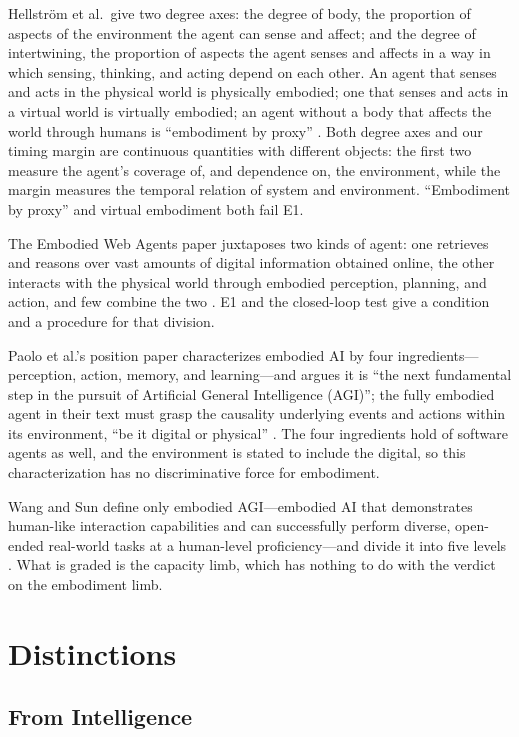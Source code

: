 \documentclass[10pt]{article}
\begin{document}
Hellstr\"om et al.\ give two degree axes: the degree of body, the proportion of aspects of the environment the agent can sense and affect; and the degree of intertwining, the proportion of aspects the agent senses and affects in a way in which sensing, thinking, and acting depend on each other. An agent that senses and acts in the physical world is physically embodied; one that senses and acts in a virtual world is virtually embodied; an agent without a body that affects the world through humans is ``embodiment by proxy'' \cite{hellstrom2024}. Both degree axes and our timing margin are continuous quantities with different objects: the first two measure the agent's coverage of, and dependence on, the environment, while the margin measures the temporal relation of system and environment. ``Embodiment by proxy'' and virtual embodiment both fail E1.

The Embodied Web Agents paper juxtaposes two kinds of agent: one retrieves and reasons over vast amounts of digital information obtained online, the other interacts with the physical world through embodied perception, planning, and action, and few combine the two \cite{ewa2025}. E1 and the closed-loop test give a condition and a procedure for that division.

Paolo et al.'s position paper characterizes embodied AI by four ingredients---perception, action, memory, and learning---and argues it is ``the next fundamental step in the pursuit of Artificial General Intelligence (AGI)''; the fully embodied agent in their text must grasp the causality underlying events and actions within its environment, ``be it digital or physical'' \cite{paolo2024}. The four ingredients hold of software agents as well, and the environment is stated to include the digital, so this characterization has no discriminative force for embodiment.

Wang and Sun define only embodied AGI---embodied AI that demonstrates human-like interaction capabilities and can successfully perform diverse, open-ended real-world tasks at a human-level proficiency---and divide it into five levels \cite{wangsung2025}. What is graded is the capacity limb, which has nothing to do with the verdict on the embodiment limb.

\section{Distinctions}\label{sec:distinction}

\subsection{From Intelligence}\label{sec:fromintelligence}
\end{document}
